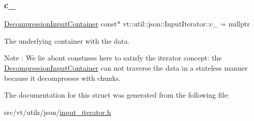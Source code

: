 \subsubsection{\texorpdfstring{c\+\_\+}{c\_}}
{\footnotesize\ttfamily \hyperlink{structvt_1_1util_1_1json_1_1_decompression_input_container}{Decompression\+Input\+Container} const$\ast$ vt\+::util\+::json\+::\+Input\+Iterator\+::c\+\_\+ = nullptr\hspace{0.3cm}{\ttfamily [private]}}

The underlying container with the data. \begin{DoxyNote}{Note}
\+: We lie about constness here to satisfy the iterator concept\+: the {\ttfamily \hyperlink{structvt_1_1util_1_1json_1_1_decompression_input_container}{Decompression\+Input\+Container}} can not traverse the data in a stateless manner because it decompresses with chunks. 
\end{DoxyNote}


The documentation for this struct was generated from the following file\+:\begin{DoxyCompactItemize}
\item 
src/vt/utils/json/\hyperlink{input__iterator_8h}{input\+\_\+iterator.\+h}\end{DoxyCompactItemize}
